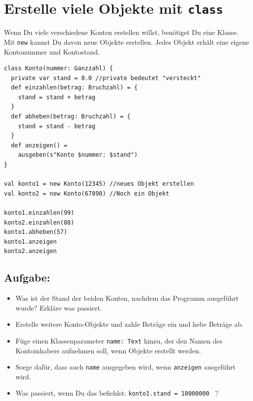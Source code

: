 \chapter{Erstelle viele Objekte mit \lstinline{class}}
\begin{multicols}{2}
Wenn Du viele verschiedene Konten erstellen willst, benötigst Du eine Klasse. Mit \lstinline{new} kannst Du davon neue Objekte erstellen. Jedes Objekt erhält eine eigene Kontonummer und Kontostand.

\begin{lstlisting}[basicstyle={\ttfamily\fontsize{13}{16}\selectfont},numbers=none]
class Konto(nummer: Ganzzahl) {
  private var stand = 0.0 //private bedeutet "versteckt"  
  def einzahlen(betrag: Bruchzahl) = {
    stand = stand + betrag 
  }
  def abheben(betrag: Bruchzahl) = { 
    stand = stand - betrag 
  }
  def anzeigen() = 
    ausgeben(s"Konto $nummer: $stand")
}

val konto1 = new Konto(12345) //neues Objekt erstellen
val konto2 = new Konto(67890) //Noch ein Objekt

konto1.einzahlen(99)
konto2.einzahlen(88)
konto1.abheben(57)
konto1.anzeigen
konto2.anzeigen
\end{lstlisting}
        


\columnbreak


\section*{\color{BrickRed}Aufgabe:}


\begin{itemize}

\item {Was ist der Stand der beiden Konten, nachdem das Programm ausgeführt wurde? Erkläre was passiert.}
\item {Erstelle weitere Konto-Objekte und zahle Beträge ein und hebe Beträge ab.}
\item {Füge einen Klassenparameter \lstinline{name: Text} hinzu, der den Namen des Kontoinhabers aufnehmen soll, wenn Objekte erstellt werden.}
\item {Sorge dafür, dass auch \lstinline{name} ausgegeben wird, wenn \lstinline{anzeigen} ausgeführt wird.}
\item {Was passiert, wenn Du das befiehlst: \lstinline{konto1.stand = 10000000 } ?}

\end{itemize}


\end{multicols}

